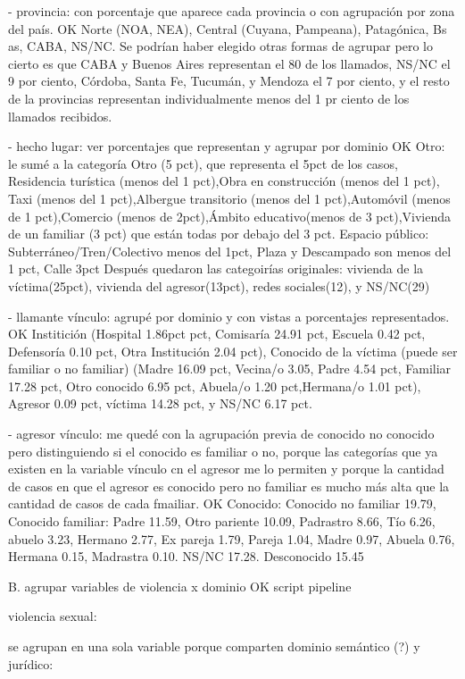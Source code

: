 \documentclass[10pt, spanish]{article}
\begin{document}
- provincia: con porcentaje que aparece cada provincia o con agrupación por zona del país. OK
Norte (NOA, NEA), Central (Cuyana, Pampeana), Patagónica, Bs as, CABA, NS/NC. Se podrían haber elegido otras formas de agrupar pero lo cierto es que CABA y Buenos Aires representan el 80 de los llamados, NS/NC el 9 por ciento, Córdoba, Santa Fe, Tucumán, y Mendoza el 7 por ciento, y el resto de la provincias representan individualmente menos del 1 pr ciento de los llamados recibidos.

- hecho lugar: ver porcentajes que representan y agrupar por dominio OK
Otro: le sumé a la categoría Otro (5 pct), que representa el 5pct de los casos,  Residencia turística (menos del 1 pct),Obra en construcción (menos del 1 pct), Taxi (menos del 1 pct),Albergue transitorio (menos del 1 pct),Automóvil (menos de 1 pct),Comercio (menos de 2pct),Ámbito educativo(menos de 3 pct),Vivienda de un familiar (3 pct) que están todas por debajo del 3 pct.
Espacio público: Subterráneo/Tren/Colectivo menos del 1pct, Plaza y Descampado son menos del 1 pct, Calle 3pct
Después quedaron las categoirías originales: vivienda de la víctima(25pct), vivienda del agresor(13pct), redes sociales(12), y NS/NC(29)


- llamante vínculo: agrupé por dominio y con vistas a porcentajes representados. OK
 Institición (Hospital 1.86pct pct, Comisaría 24.91 pct, Escuela 0.42 pct, Defensoría 0.10 pct, Otra Institución 2.04 pct), Conocido de la víctima (puede ser familiar o no familiar) (Madre 16.09 pct, Vecina/o 3.05, Padre 4.54 pct, Familiar 17.28 pct, Otro conocido 6.95 pct, Abuela/o 1.20 pct,Hermana/o 1.01 pct), Agresor 0.09 pct, víctima 14.28 pct, y NS/NC 6.17 pct.

- agresor vínculo: me quedé con la agrupación previa de conocido no conocido pero distinguiendo si el conocido es familiar o no, porque las categorías que ya existen en la variable vínculo cn el agresor me lo permiten y porque la cantidad de casos en que el agresor es conocido pero no familiar es mucho más alta que la cantidad de casos de cada fmailiar. OK
Conocido: Conocido no familiar 19.79, Conocido familiar: Padre 11.59, Otro pariente 10.09, Padrastro 8.66, Tío 6.26, abuelo 3.23, Hermano 2.77, Ex pareja 1.79, Pareja 1.04, Madre 0.97, Abuela 0.76, Hermana 0.15, Madrastra 0.10. NS/NC 17.28. Desconocido 15.45  


B. agrupar variables de violencia x dominio OK script pipeline 

violencia sexual:

se agrupan en una sola variable porque comparten dominio semántico (?) y jurídico:
\end{document}

